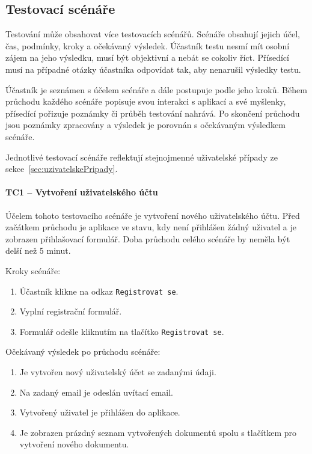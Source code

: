 
\subsection{Testovací scénáře}\label{subsec:testovacíScénáře}

Testování může obsahovat více testovacích scénářů.
Scénáře obsahují jejich účel, čas, podmínky, kroky a očekávaný výsledek.
Účastník testu nesmí mít osobní zájem na jeho výsledku, musí být objektivní a nebát se cokoliv říct.
Přísedící musí na případné otázky účastníka odpovídat tak, aby nenarušil výsledky testu.

Účastník je seznámen s účelem scénáře a dále postupuje podle jeho kroků.
Během průchodu každého scénáře popisuje svou interakci s aplikací a své myšlenky, přísedící pořizuje poznámky či průběh testování nahrává.
Po skončení průchodu jsou poznámky zpracovány a výsledek je porovnán s očekávaným výsledkem scénáře.

Jednotlivé testovací scénáře reflektují stejnojmenné uživatelské případy ze sekce~\ref{sec:uzivatelskePripady}.

\paragraph{TC1 -- Vytvoření uživatelského účtu}

Účelem tohoto testovacího scénáře je vytvoření nového uživatelského účtu.
Před začátkem průchodu je aplikace ve stavu, kdy není přihlášen žádný uživatel a je zobrazen přihlašovací formulář.
Doba průchodu celého scénáře by neměla být delší než 5 minut.

Kroky scénáře:
\begin{enumerate}
    \item Účastník klikne na odkaz \texttt{Registrovat se}.
    \item Vyplní registrační formulář.
    \item Formulář odešle kliknutím na tlačítko \texttt{Registrovat se}.
\end{enumerate}

Očekávaný výsledek po průchodu scénáře:
\begin{enumerate}
    \item Je vytvořen nový uživatelský účet se zadanými údaji.
    \item Na zadaný email je odeslán uvítací email.
    \item Vytvořený uživatel je přihlášen do aplikace.
    \item Je zobrazen prázdný seznam vytvořených dokumentů spolu s tlačítkem pro vytvoření nového dokumentu.
\end{enumerate}

